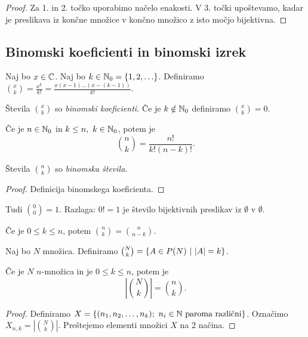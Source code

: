 \begin{proof}
    Za 1. in 2. točko uporabimo načelo enakosti. V 3. točki upoštevamo, kadar je preslikava iz končne množice v končno množico z isto močjo bijektivna.
\end{proof}

\newpage
\subsection{Binomski koeficienti in binomski izrek}
\begin{definicija}
    Naj bo $x \in \mathbb{C}$. Naj bo $k \in \mathbb{N}_0 = \left\{1, 2, \ldots\right\}$. Definiramo $\binom{x}{k} = \frac{x^{\underline{k}}}{k!} = \frac{x(x-1)\ldots (x-(k-1))}{k!}$. 
    
    Števila $\binom{x}{k}$ so \emph{binomski koeficienti.}
    Če je $k \notin \mathbb{N}_0$ definiramo $\binom{x}{k} = 0$.
\end{definicija}

\begin{trditev}
    Če je $n \in \mathbb{N}_0$ in $k \leq n, \ k \in \mathbb{N}_0$, potem je 
    $$\binom{n}{k} = \frac{n!}{k!(n-k)!}.$$

    Števila $\binom{n}{k}$ so \emph{binomska števila.}
\end{trditev}

\begin{proof}
    Definicija binomskega koeficienta.
\end{proof}

\begin{opomba}
    Tudi $\binom{0}{0} = 1$. Razlaga: $0! = 1$ je število bijektivnih preslikav iz $\emptyset$ v $\emptyset$.
\end{opomba}

\begin{opomba}
    Če je $0 \leq k \leq n$, potem $\binom{n}{k} = \binom{n}{n-k}$.
\end{opomba}

\begin{definicija}
    Naj bo $N$ množica. Definiramo $\binom{N}{k} = \left\{A \in P(N) \ | \ |A| = k\right\}$.
\end{definicija}

\begin{trditev}
    Če je $N$ $n$-množica in je $0 \leq k \leq n$, potem je 
    $$\left| \binom{N}{k} \right| = \binom{n}{k}.$$
\end{trditev}

\begin{proof}
    Definiramo $X = \left\{(n_1, n_2, \ldots, n_k); \ n_i \in \mathbb{N} \text{ paroma različni}\right\}$. Označimo $X_{n,k} = \left| \binom{N}{k} \right|$. Preštejemo elementi množici $X$ na 2 načina.
\end{proof}

